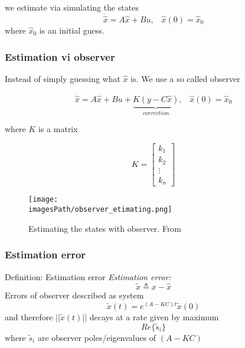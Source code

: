 we estimate via simulating the states
\begin{equation*}
    \dot{\hat{x}} = A\hat{x} + Bu, \;\;\; \hat{x}(0) = \hat{x}_0
\end{equation*}
where $\hat{x}_0$ is an initial guess.

\subsubsection{Estimation vi observer}
Instead of simply guessing what $\hat{x}$ is. 
We use a so called observer

\begin{equation*}
    \dot{\hat{x}} = A\hat{x} + Bu + \underbrace{K(y-C\hat{x})}_{correction}, \;\;\; \hat{x}(0) = \hat{x}_0
\end{equation*}

where $K$ is a matrix

\begin{equation*}
    K = \begin{bmatrix} k_1 \\ k_2 \\ \vdots \\ k_n \end{bmatrix}
\end{equation*}

\begin{figure}[!h]
    \centering
    \texttt{[image: \\imagesPath/observer\_etimating.png]}
    \caption{Estimating the states with observer. From \cite{}}
\end{figure}

\subsubsection{Estimation error}
\begin{definitionblock}{Definition: Estimation error}
    \textit{Estimation error:}
    \begin{equation*}
        \tilde{x} \triangleq x-\hat{x}
    \end{equation*}
    Errors of observer described as system 
    \begin{equation*}
        \tilde{x}(t) = e^{(A-KC)t}\tilde{x}(0)
    \end{equation*}
    and therefore $||\tilde{x}(t)||$ decays at a rate given by maximum
    \begin{equation*}
        Re\{\tilde{s}_i\}
    \end{equation*}
    where $\tilde{s}_i$ are observer poles/eigenvalues of $(A-KC)$ 
\end{definitionblock}

